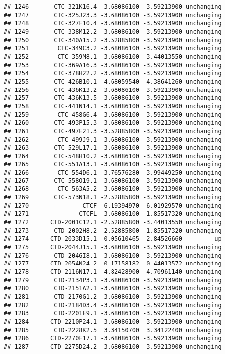 \documentclass[]{article}
\begin{document}
\begin{verbatim}
## 1246       CTC-321K16.4 -3.68086100 -3.59213900 unchanging
## 1247       CTC-325J23.3 -3.68086100 -3.59213900 unchanging
## 1248       CTC-327F10.4 -3.68086100 -3.59213900 unchanging
## 1249       CTC-338M12.2 -3.68086100 -3.59213900 unchanging
## 1250       CTC-340A15.2 -3.52885800 -3.59213900 unchanging
## 1251        CTC-349C3.2 -3.68086100 -3.59213900 unchanging
## 1252        CTC-359M8.1 -3.68086100 -3.44013550 unchanging
## 1253       CTC-369A16.3 -3.68086100 -3.59213900 unchanging
## 1254       CTC-378H22.2 -3.68086100 -3.59213900 unchanging
## 1255       CTC-426B10.1  4.68059540  4.38641260 unchanging
## 1256       CTC-436K13.2 -3.68086100 -3.59213900 unchanging
## 1257       CTC-436K13.5 -3.68086100 -3.59213900 unchanging
## 1258       CTC-441N14.1 -3.68086100 -3.59213900 unchanging
## 1259        CTC-458G6.4 -3.68086100 -3.59213900 unchanging
## 1260       CTC-493P15.3 -3.68086100 -3.59213900 unchanging
## 1261       CTC-497E21.3 -3.52885800 -3.59213900 unchanging
## 1262        CTC-499J9.1 -3.68086100 -3.59213900 unchanging
## 1263       CTC-529L17.1 -3.68086100 -3.59213900 unchanging
## 1264       CTC-548H10.2 -3.68086100 -3.59213900 unchanging
## 1265       CTC-551A13.1 -3.68086100 -3.59213900 unchanging
## 1266        CTC-554D6.1  3.76576280  3.99449250 unchanging
## 1267       CTC-558O19.1 -3.68086100 -3.59213900 unchanging
## 1268        CTC-563A5.2 -3.68086100 -3.59213900 unchanging
## 1269       CTC-573N18.1 -2.52885800 -3.59213900 unchanging
## 1270               CTCF  6.19394970  6.01929570 unchanging
## 1271              CTCFL -3.68086100 -1.85517320 unchanging
## 1272      CTD-2001C12.1 -2.52885800 -3.44013550 unchanging
## 1273       CTD-2002H8.2 -2.52885800 -1.85517320 unchanging
## 1274      CTD-2033D15.1  0.05610465  2.84526660         up
## 1275      CTD-2044J15.1 -3.68086100 -3.59213900 unchanging
## 1276       CTD-2046I8.1 -3.68086100 -3.59213900 unchanging
## 1277      CTD-2054N24.2  0.17158182 -0.44013572 unchanging
## 1278      CTD-2116N17.1  4.82428900  4.70961140 unchanging
## 1279       CTD-2134P3.1 -3.68086100 -3.59213900 unchanging
## 1280       CTD-2151A2.1 -3.68086100 -3.59213900 unchanging
## 1281       CTD-2170G1.2 -3.68086100 -3.59213900 unchanging
## 1282       CTD-2184D3.4 -3.68086100 -3.59213900 unchanging
## 1283       CTD-2201E9.1 -3.68086100 -3.59213900 unchanging
## 1284      CTD-2210P24.1 -3.68086100 -3.59213900 unchanging
## 1285       CTD-2228K2.5  3.34150700  3.34122400 unchanging
## 1286      CTD-2270F17.1 -3.68086100 -3.59213900 unchanging
## 1287      CTD-2275D24.2 -3.68086100 -3.59213900 unchanging

\end{verbatim}
\end{document}
